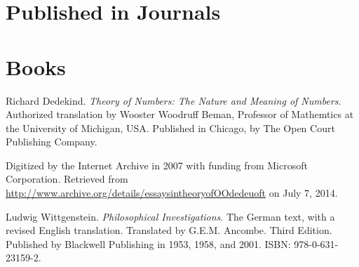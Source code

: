 \begin{thebibliography}{9} %

\section*{Published in Journals}








\section*{Books}


Richard Dedekind. \emph{Theory of Numbers: The Nature and Meaning of Numbers}.
Authorized translation by Wooster Woodruff Beman, Professor of Mathemtics at
the University of Michigan, USA. Published in Chicago, by The Open Court
Publishing Company.

Digitized by the Internet Archive in 2007 with funding from Microsoft
Corporation. Retrieved from
\url{http://www.archive.org/details/essaysintheoryofOOdedeuoft} on July 7,
2014.

\backrefprint


Ludwig Wittgenstein. \emph{Philosophical Investigations}. The German text, with
a revised English translation.  Translated by G.E.M. Ancombe. Third Edition.
Published by Blackwell Publishing in 1953, 1958, and 2001. ISBN:
978-0-631-23159-2.


\end{thebibliography}
